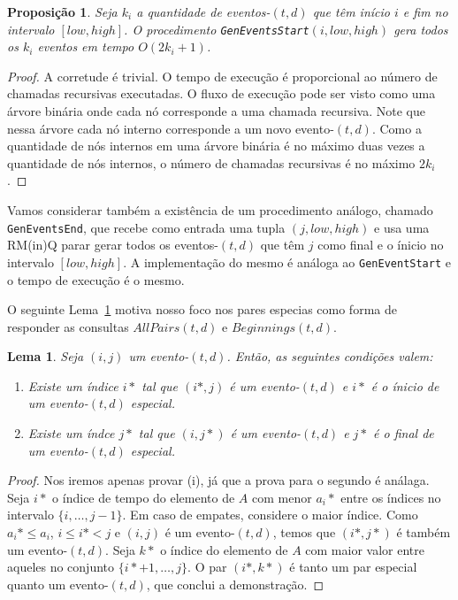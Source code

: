 \documentclass[dissertacao, brazil]{ThesisPUC}
\newtheorem{lem}[thm]{Lema}
\newtheorem{prop}[thm]{Proposição}
\begin{document}
\begin{prop}
Seja $k_i$ a quantidade de eventos-$(t,d)$ que têm início $i$ e fim no intervalo $[low, high]$.
O procedimento {\tt GenEventsStart}$(i, low, high)$ gera todos os $k_i$ eventos em tempo $O(2k_i + 1)$.
\end{prop}

\begin{proof}
A corretude é trivial. O tempo de execução é proporcional ao número de chamadas recursivas
executadas. O fluxo de execução pode ser visto como uma árvore binária onde cada nó corresponde
a uma chamada recursiva. Note que nessa árvore cada nó interno corresponde a um novo evento-$(t,d)$.
Como a quantidade de nós internos em uma árvore binária é no máximo duas vezes a quantidade de nós
internos, o número de chamadas recursivas é no máximo $2k_i$.
\end{proof}

Vamos considerar também a existência de um procedimento análogo, chamado {\tt GenEventsEnd}, que recebe
como entrada uma tupla $(j, low, high)$ e usa uma RM(in)Q parar gerar todos os eventos-$(t,d)$ que 
têm $j$ como final e o ínicio no intervalo $[low, high]$. A implementação do mesmo é análoga ao 
{\tt GenEventStart} e o tempo de execução é o mesmo.  

O seguinte Lema~\ref{mainlem} motiva nosso foco nos pares especias como forma de responder as consultas
$AllPairs(t,d)$ e $Beginnings(t,d)$.

\begin{lem}  
Seja $(i, j)$ um evento-$(t,d)$. Então, as seguintes condições valem:
\begin{enumerate}
\item Existe um índice $i*$ tal que $(i*, j)$ é um evento-$(t,d)$ e $i*$ é o ínicio de um 
evento-$(t,d)$ especial. 
\item Existe um índce $j*$ tal que $(i, j*)$ é um evento-$(t,d)$ e $j*$ é o final de um
evento-$(t,d)$ especial.
\end{enumerate}
\label{mainlem}
\end{lem}
\begin{proof}
Nos iremos apenas provar (i), já que a prova para o segundo é análaga. Seja $i*$ o índice
de tempo do elemento de $A$ com menor $a_i*$ entre os índices no intervalo $\{i, \ldots, j -1\}$.
Em caso de empates, considere o maior índice. Como $a_i* \le a_i$, $i \le i* < j$ e $(i, j)$ é um
evento-$(t,d)$, temos que $(i*, j*)$ é também um evento-$(t,d)$. Seja $k*$ o índice do elemento
de $A$ com maior valor entre aqueles no conjunto $\{i* + 1, \ldots, j\}$. O par $(i*, k*)$ é 
tanto um par especial quanto um evento-$(t,d)$, que conclui a demonstração.
\end{proof}
\end{document}
